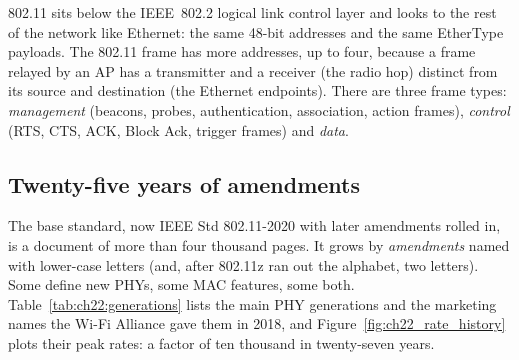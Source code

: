 802.11 sits below the IEEE~802.2 logical link control layer and looks to the rest of the network
like Ethernet: the same 48-bit addresses and the same EtherType payloads. The 802.11 frame has
more addresses, up to four, because a frame relayed by an AP has a transmitter and a receiver (the
radio hop) distinct from its source and destination (the Ethernet endpoints). There are three
frame types: \emph{management} (beacons, probes, authentication, association, action frames),
\emph{control} (RTS, CTS, ACK, Block Ack, trigger frames) and \emph{data}.

\subsection{Twenty-five years of amendments}

The base standard, now IEEE Std 802.11-2020 with later amendments rolled in, is a document of more
than four thousand pages. It grows by \emph{amendments} named with lower-case letters (and, after
802.11z ran out the alphabet, two letters). Some define new PHYs, some MAC features, some both.
Table~\ref{tab:ch22:generations} lists the main PHY generations and the marketing names the Wi-Fi
Alliance gave them in 2018, and Figure~\ref{fig:ch22_rate_history} plots their peak rates: a factor
of ten thousand in twenty-seven years.

